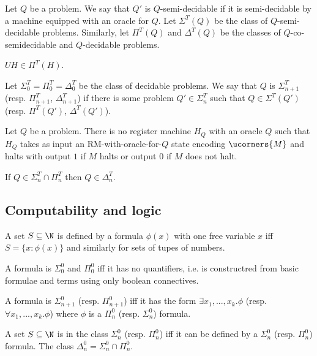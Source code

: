 \documentclass{article}
\begin{document}
\begin{definition*}
	Let $Q$ be a problem. We say that $Q'$ is $Q$-semi-decidable if it is semi-decidable
	by a machine equipped with an oracle for $Q$. Let $\Sigma^T(Q)$ be the class of
	$Q$-semi-decidable problems. Similarly, let $\Pi^T(Q)$ and $\Delta^T(Q)$ be the
	classes of $Q$-co-semidecidable and $Q$-decidable problems.
\end{definition*}

\begin{theorem*}
	$UH\in\Pi^T(H)$.
\end{theorem*}

\begin{definition*}
	Let $\Sigma_0^T=\Pi^T_0=\Delta^T_0$ be the class of decidable problems. We say
	that $Q$ is $\Sigma_{n+1}^T$ (resp. $\Pi_{n+1}^T$, $\Delta_{n+1}^T$)
	if there is some problem $Q'\in\Sigma_n^T$ such that $Q\in\Sigma^T(Q')$
	(resp. $\Pi^T(Q')$, $\Delta^T(Q')$).
\end{definition*}

\begin{theorem*}[Notes I.35]
	Let $Q$ be a problem. There is no register machine $H_Q$ with an oracle $Q$
	such that $H_Q$ takes as input an RM-with-oracle-for-$Q$ state encoding
	$\ucorners{M}$ and halts with output $1$ if $M$ halts or output $0$ if $M$ does not halt.
\end{theorem*}

\begin{theorem*}[Notes I.36]
	If $Q\in\Sigma_n^T\cap\Pi_n^T$ then $Q\in\Delta^T_n$.
\end{theorem*}

\subsection{Computability and logic}

\begin{definition*}
	A set $S\subseteq\N$ is defined by a formula $\phi(x)$ with one free variable
	$x$ iff $S=\{x:\phi(x)\}$ and similarly for sets of tupes of numbers.
\end{definition*}

\begin{definition*}
	A formula is $\Sigma_0^0$ and $\Pi_0^0$ iff it has no quantifiers, i.e. is
	constructred from basic formulae and terms using only boolean connectives.

	A formula is $\Sigma_{n+1}^0$ (resp. $\Pi_{n+1}^0$) iff it has the form
	$\exists x_1,...,x_k.\phi$ (resp. $\forall x_1,...,x_k.\phi$) where
	$\phi$ is a $\Pi_n^0$ (resp. $\Sigma_n^0$) formula.

	A set $S\subseteq\N$ is in the class $\Sigma_n^0$ (resp. $\Pi_n^0$)
	iff it can be defined by a $\Sigma_n^0$ (resp. $\Pi_n^0$)
	formula. The class $\Delta_n^0 = \Sigma_n^0\cap\Pi_n^0$.
\end{definition*}
\end{document}
